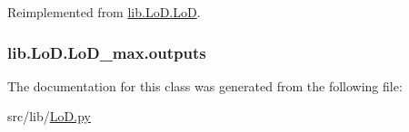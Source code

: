 Reimplemented from \hyperlink{classlib_1_1_lo_d_1_1_lo_d_a9d7425cf14f1f5b52625b8b6e924214e}{lib.\-Lo\-D.\-Lo\-D}.

\hypertarget{classlib_1_1_lo_d_1_1_lo_d__max_afa61c79182ccb3f98db16449e41db00b}{
\subsubsection[{outputs}]{\setlength{\rightskip}{0pt plus 5cm}lib.\-Lo\-D.\-Lo\-D\-\_\-max.\-outputs}}\label{classlib_1_1_lo_d_1_1_lo_d__max_afa61c79182ccb3f98db16449e41db00b}


The documentation for this class was generated from the following file\-:\begin{DoxyCompactItemize}
\item 
src/lib/\hyperlink{_lo_d_8py}{Lo\-D.\-py}\end{DoxyCompactItemize}
